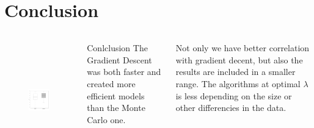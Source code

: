 \documentclass[presentation]{beamer}   %
\begin{document}
\section{Conclusion}
\begin{frame}
  \begin{columns}[t] %
		\begin{figure}
		\centering
			\includegraphics[width=50mm,height=50mm]{fig/boxplot.pdf}
		\end{figure}
		\centering
		\begin{block}{Conlclusion}
			The Gradient Descent was both faster and created more efficient models than the Monte Carlo one.
		\end{block}
		\begin{block}\centering
			Not only we have better correlation with gradient decent, but also the results are included in a smaller range. The algorithms at optimal $\lambda$ is less depending on the size or other differencies in the data.
		\end{block}
  \end{columns}
\end{frame}
\end{document}
